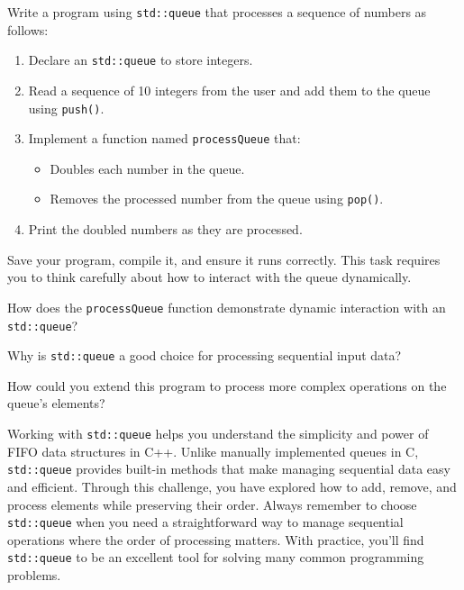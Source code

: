 \begin{challenge}
    \begin{task}
        Write a program using \texttt{std::queue} that processes a sequence of numbers as follows:
        \begin{enumerate}
            \item Declare an \texttt{std::queue} to store integers.
            \item Read a sequence of 10 integers from the user and add them to the queue using \texttt{push()}.
            \item Implement a function named \texttt{processQueue} that:
                \begin{itemize}
                    \item Doubles each number in the queue.
                    \item Removes the processed number from the queue using \texttt{pop()}.
                \end{itemize}
            \item Print the doubled numbers as they are processed.
        \end{enumerate}

        Save your program, compile it, and ensure it runs correctly. This task requires you to think carefully about how to interact with the queue dynamically.

        \begin{questions}
            \item How does the \texttt{processQueue} function demonstrate dynamic interaction with an \texttt{std::queue}?
            \item Why is \texttt{std::queue} a good choice for processing sequential input data?
            \item How could you extend this program to process more complex operations on the queue’s elements?
        \end{questions}
    \end{task}

    \begin{advice}
        Working with \texttt{std::queue} helps you understand the simplicity and power of FIFO data structures in C++. 
        Unlike manually implemented queues in C, \texttt{std::queue} provides built-in methods that make managing sequential data easy and efficient. 
        Through this challenge, you have explored how to add, remove, and process elements while preserving their order. 
        Always remember to choose \texttt{std::queue} when you need a straightforward way to manage sequential operations where the order of processing matters. 
        With practice, you'll find \texttt{std::queue} to be an excellent tool for solving many common programming problems.
    \end{advice}
\end{challenge}
